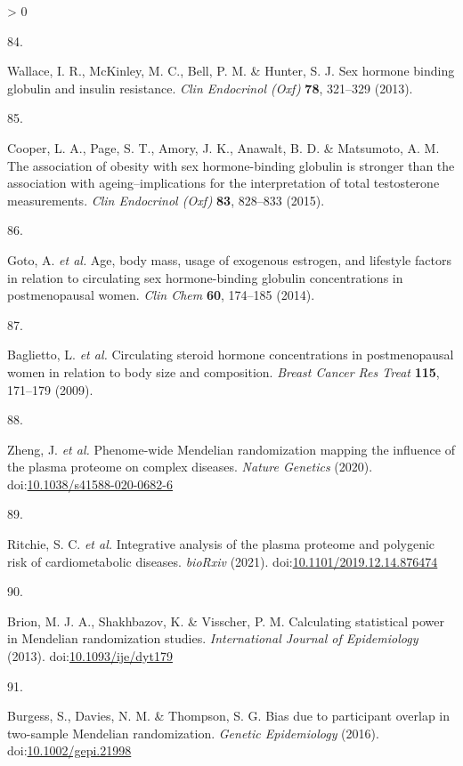 \documentclass[11pt,twoside]{bristolthesis}
\newlength{\cslhangindent}
\newlength{\csllabelwidth}
\newenvironment{CSLReferences}[2] %
 {%
  \setlength{\parindent}{0pt}
  \ifodd #1 \everypar{\setlength{\hangindent}{\cslhangindent}}\ignorespaces\fi
  \ifnum #2 > 0
  \setlength{\parskip}{#2\baselineskip}
  \fi
 }%
 {}
\newcommand{\CSLLeftMargin}[1]{\parbox[t]{\csllabelwidth}{#1}}
\newcommand{\CSLRightInline}[1]{\parbox[t]{\linewidth - \csllabelwidth}{#1}\break}
\begin{document}
\begin{CSLReferences}{0}{0}
\leavevmode\hypertarget{ref-Wallace2013}{}%
\CSLLeftMargin{84. }
\CSLRightInline{Wallace, I. R., McKinley, M. C., Bell, P. M. \& Hunter, S. J. {Sex hormone binding globulin and insulin resistance}. \emph{Clin Endocrinol (Oxf)} \textbf{78}, 321--329 (2013).}

\leavevmode\hypertarget{ref-Cooper2015}{}%
\CSLLeftMargin{85. }
\CSLRightInline{Cooper, L. A., Page, S. T., Amory, J. K., Anawalt, B. D. \& Matsumoto, A. M. {The association of obesity with sex hormone-binding globulin is stronger than the association with ageing--implications for the interpretation of total testosterone measurements}. \emph{Clin Endocrinol (Oxf)} \textbf{83}, 828--833 (2015).}

\leavevmode\hypertarget{ref-Goto2014}{}%
\CSLLeftMargin{86. }
\CSLRightInline{Goto, A. \emph{et al.} {Age, body mass, usage of exogenous estrogen, and lifestyle factors in relation to circulating sex hormone-binding globulin concentrations in postmenopausal women}. \emph{Clin Chem} \textbf{60}, 174--185 (2014).}

\leavevmode\hypertarget{ref-Baglietto2009}{}%
\CSLLeftMargin{87. }
\CSLRightInline{Baglietto, L. \emph{et al.} {Circulating steroid hormone concentrations in postmenopausal women in relation to body size and composition}. \emph{Breast Cancer Res Treat} \textbf{115}, 171--179 (2009).}

\leavevmode\hypertarget{ref-Zheng2020}{}%
\CSLLeftMargin{88. }
\CSLRightInline{Zheng, J. \emph{et al.} {Phenome-wide Mendelian randomization mapping the influence of the plasma proteome on complex diseases}. \emph{Nature Genetics} (2020). doi:\href{https://doi.org/10.1038/s41588-020-0682-6}{10.1038/s41588-020-0682-6}}

\leavevmode\hypertarget{ref-Ritchie2019}{}%
\CSLLeftMargin{89. }
\CSLRightInline{Ritchie, S. C. \emph{et al.} {Integrative analysis of the plasma proteome and polygenic risk of cardiometabolic diseases}. \emph{bioRxiv} (2021). doi:\href{https://doi.org/10.1101/2019.12.14.876474}{10.1101/2019.12.14.876474}}

\leavevmode\hypertarget{ref-Brion2013}{}%
\CSLLeftMargin{90. }
\CSLRightInline{Brion, M. J. A., Shakhbazov, K. \& Visscher, P. M. {Calculating statistical power in Mendelian randomization studies}. \emph{International Journal of Epidemiology} (2013). doi:\href{https://doi.org/10.1093/ije/dyt179}{10.1093/ije/dyt179}}

\leavevmode\hypertarget{ref-Burgess2016}{}%
\CSLLeftMargin{91. }
\CSLRightInline{Burgess, S., Davies, N. M. \& Thompson, S. G. {Bias due to participant overlap in two-sample Mendelian randomization}. \emph{Genetic Epidemiology} (2016). doi:\href{https://doi.org/10.1002/gepi.21998}{10.1002/gepi.21998}}


\end{CSLReferences}
\end{document}
